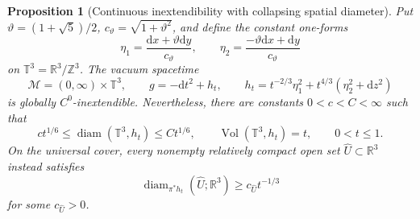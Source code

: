 \documentclass[10pt,a4paper]{article}
\numberwithin{equation}{section}
\newtheorem{proposition}[theorem]{Proposition}
\theoremstyle{definition}
\theoremstyle{remark}
\newcommand{\R}{\mathbb R}
\newcommand{\dd}{\mathrm d}
\newcommand{\diam}{\operatorname{diam}}
\newcommand{\Vol}{\operatorname{Vol}}
\newcommand{\cM}{\mathcal M}
\begin{document}
\begin{proposition}[Continuous inextendibility with collapsing spatial diameter]
\label{prop:irrational-kasner}
Put $\vartheta=(1+\sqrt5)/2$, $c_\vartheta=\sqrt{1+\vartheta^2}$, and define
the constant one-forms
\[
 \eta_1=\frac{\dd x+\vartheta\dd y}{c_\vartheta},\qquad
 \eta_2=\frac{-\vartheta\dd x+\dd y}{c_\vartheta}
\]
on $\mathbb T^3=\R^3/\mathbb Z^3$.  The vacuum spacetime
\begin{equation}
 \cM=(0,\infty)\times\mathbb T^3,\qquad
 g=-\dd t^2+h_t,\qquad
 h_t=t^{-2/3}\eta_1^2+t^{4/3}(\eta_2^2+\dd z^2)
 \label{eq:irrational-kasner}
\end{equation}
is globally $C^0$-inextendible.  Nevertheless, there are constants
$0<c<C<\infty$ such that
\begin{equation}
 c t^{1/6}\le\diam(\mathbb T^3,h_t)\le C t^{1/6},\qquad
 \Vol(\mathbb T^3,h_t)=t,
 \qquad 0<t\le1.
 \label{eq:irrational-kasner-collapse}
\end{equation}
On the universal cover, every nonempty relatively compact open set
$\widehat U\subset\R^3$ instead satisfies
\begin{equation}
 \diam_{\pi^*h_t}(\widehat U;\R^3)
 \ge c_{\widehat U}t^{-1/3}
 \label{eq:irrational-kasner-lifted}
\end{equation}
for some $c_{\widehat U}>0$.
\end{proposition}
\end{document}
